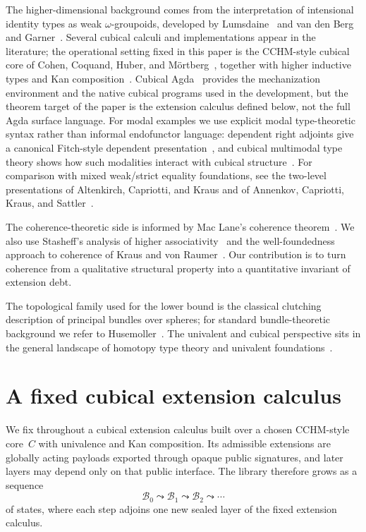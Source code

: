 \documentclass{lmcs}
\newcommand{\B}{\mathcal{B}}
\begin{document}
The higher-dimensional background comes from the interpretation of intensional identity types as weak $\omega$-groupoids, developed by Lumsdaine~\cite{lumsdaine} and van den Berg and Garner~\cite{vdberg-garner}. Several cubical calculi and implementations appear in the literature; the operational setting fixed in this paper is the CCHM-style cubical core of Cohen, Coquand, Huber, and M\"ortberg~\cite{cubical}, together with higher inductive types and Kan composition~\cite{cchm-hits}. Cubical Agda~\cite{cubical-agda} provides the mechanization environment and the native cubical programs used in the development, but the theorem target of the paper is the extension calculus defined below, not the full Agda surface language. For modal examples we use explicit modal type-theoretic syntax rather than informal endofunctor language: dependent right adjoints give a canonical Fitch-style dependent presentation~\cite{birkedal-modal-dtt}, and cubical multimodal type theory shows how such modalities interact with cubical structure~\cite{aagaard-cubical-mtt}. For comparison with mixed weak/strict equality foundations, see the two-level presentations of Altenkirch, Capriotti, and Kraus and of Annenkov, Capriotti, Kraus, and Sattler~\cite{altenkirch-strict,annenkov-2ltt}.

The coherence-theoretic side is informed by Mac Lane's coherence theorem~\cite{maclane-coherence}. We also use Stasheff's analysis of higher associativity~\cite{stasheff} and the well-foundedness approach to coherence of Kraus and von Raumer~\cite{kraus-vonraumer}. Our contribution is to turn coherence from a qualitative structural property into a quantitative invariant of extension debt.

The topological family used for the lower bound is the classical clutching description of principal bundles over spheres; for standard bundle-theoretic background we refer to Husemoller~\cite{husemoller}. The univalent and cubical perspective sits in the general landscape of homotopy type theory and univalent foundations~\cite{hott}.

\section{A fixed cubical extension calculus}
\label{sec:framework}

We fix throughout a cubical extension calculus built over a chosen CCHM-style core~$C$ with univalence and Kan composition. Its admissible extensions are globally acting payloads exported through opaque public signatures, and later layers may depend only on that public interface. The library therefore grows as a sequence
\[
  \B_0 \leadsto \B_1 \leadsto \B_2 \leadsto \cdots
\]
of states, where each step adjoins one new sealed layer of the fixed extension calculus.
\end{document}
